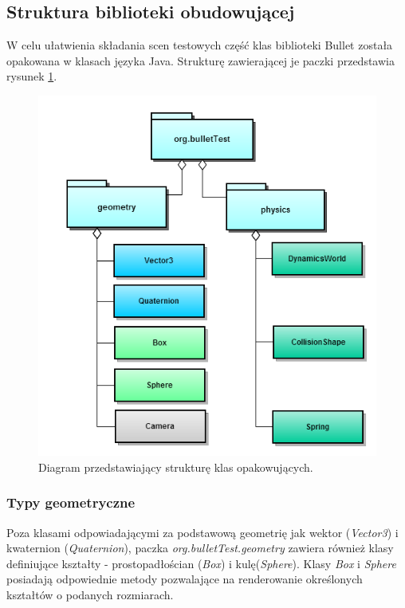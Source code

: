 \subsection{Struktura biblioteki obudowującej}
W celu ułatwienia składania scen testowych część klas biblioteki Bullet została
opakowana w klasach języka Java. Strukturę zawierającej je paczki przedstawia
rysunek \ref{fig:DiagStructure}.
\begin{figure}[H]
\centering
\includegraphics[scale=0.5]{./img/packageDiagram.png}
\caption{Diagram przedstawiający strukturę klas opakowujących.}
\label{fig:DiagStructure}
\end{figure}

\subsubsection{Typy geometryczne}
Poza klasami odpowiadającymi za podstawową geometrię jak wektor (\emph{Vector3})
i kwaternion (\emph{Quaternion}), paczka \emph{org.bulletTest.geometry} zawiera
również klasy definiujące kształty - prostopadłościan (\emph{Box}) i
kulę(\emph{Sphere}). Klasy \emph{Box} i \emph{Sphere} posiadają
odpowiednie metody pozwalające na renderowanie określonych kształtów
o podanych rozmiarach.

